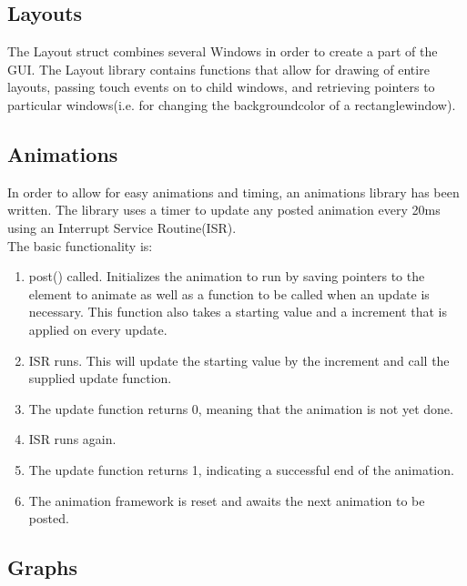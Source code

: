 \subsection{Layouts}
The Layout struct combines several Windows in order to create a part of the GUI. The Layout library contains functions that allow for drawing of entire layouts, passing touch events on to child windows, and retrieving pointers to particular windows(i.e. for changing the backgroundcolor of a rectanglewindow).

\subsection{Animations}
In order to allow for easy animations and timing, an animations library has been written. The library uses a timer to update any posted animation every 20ms using an Interrupt Service Routine(ISR).\\

\noindent
The basic functionality is:
\begin{enumerate}
\item post() called. Initializes the animation to run by saving pointers to the element to animate as well as a function to be called when an update is necessary. This function also takes a starting value and a increment that is applied on every update.
\item ISR runs. This will update the starting value by the increment and call the supplied update function.
\item The update function returns 0, meaning that the animation is not yet done.
\item ISR runs again.
\item The update function returns 1, indicating a successful end of the animation.
\item The animation framework is reset and awaits the next animation to be posted.
\end{enumerate}

\subsection{Graphs}